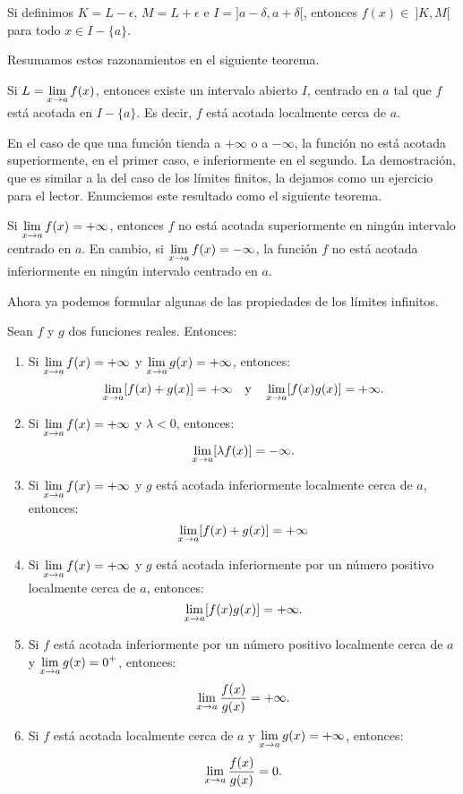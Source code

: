 Si definimos $K = L - \epsilon$, $M = L + \epsilon$ e $I = ]a - \delta, a + \delta[$, entonces
$f(x) \in\ ]K,M[$ para todo $x\in I - \{a\}$.

Resumamos estos razonamientos en el siguiente teorema.

\begin{teocal}\label{teo:LimLimAcotada}%
Si $L = \displaystyle\limjc{f(x)}{x}{a}$, entonces existe un intervalo abierto $I$, centrado en $a$ tal
que $f$ está acotada en $I - \{a\}$. Es decir, $f$ está acotada localmente cerca de $a$.
\end{teocal}

En el caso de que una función tienda a $+\infty$ o a $-\infty$, la función no está acotada
superiormente, en el primer caso, e inferiormente en el segundo. La demostración, que es similar a
la del caso de los límites finitos, la dejamos como un ejercicio para el lector. Enunciemos este
resultado como el siguiente teorema.

\begin{teocal}
Si $\displaystyle\limjc{f(x)}{x}{a} = +\infty$, entonces $f$ no está acotada superiormente en
ningún intervalo centrado en $a$. En cambio, si $\displaystyle\limjc{f(x)}{x}{a} = -\infty$, la
función $f$ no está acotada inferiormente en ningún intervalo centrado en $a$.
\end{teocal}

Ahora ya podemos formular algunas de las propiedades de los límites infinitos.

\begin{teocal}\label{teo:LimPropLimInf}%
Sean $f$ y $g$ dos funciones reales. Entonces:
\begin{enumerate}[leftmargin=*]
\item Si $\displaystyle\limjc{f(x)}{x}{a} = +\infty$ y $\displaystyle\limjc{g(x)}{x}{a} = +\infty $, entonces:
    \[
      \limjc{[f(x) + g(x)]}{x}{a} = +\infty \yjc
      \limjc{[f(x)g(x)]}{x}{a} = +\infty.
    \]
\item Si $\displaystyle\limjc{f(x)}{x}{a} = +\infty$ y $\lambda < 0$, entonces:
    \[
      \limjc{[\lambda f(x)]}{x}{a} = -\infty.
    \]
\item Si $\displaystyle\limjc{f(x)}{x}{a} = +\infty$ y $g$ está acotada inferiormente localmente cerca de $a$, entonces:
    \[
      \limjc{[f(x) + g(x)]}{x}{a} = +\infty
    \]
\item Si $\displaystyle\limjc{f(x)}{x}{a} = +\infty$ y $g$ está acotada inferiormente por un número positivo localmente cerca de $a$, entonces:
    \[
      \limjc{[f(x)g(x)]}{x}{a} = +\infty.
    \]
\item Si $f$ está acotada inferiormente por un número positivo localmente cerca de $a$ y $\displaystyle\limjc{g(x)}{x}{a} = 0^+$, entonces:
    \[
      \limjc{\frac{f(x)}{g(x)}}{x}{a} = +\infty.
    \]
\item Si $f$ está acotada localmente cerca de $a$ y $\displaystyle\limjc{g(x)}{x}{a} = +\infty$,
    entonces:
    \[
      \limjc{\frac{f(x)}{g(x)}}{x}{a} = 0.
    \]
\end{enumerate}
\end{teocal}

